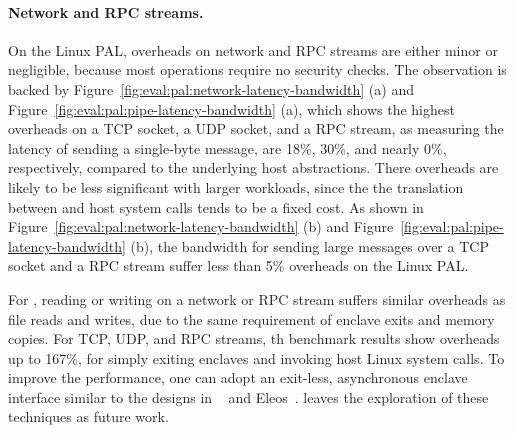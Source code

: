 






\paragraph{Network and RPC streams.}
On the Linux PAL, overheads on network and RPC streams are either minor or negligible,
because most operations require
no security checks.
The observation is backed by Figure~\ref{fig:eval:pal:network-latency-bandwidth} (a)
and
Figure~\ref{fig:eval:pal:pipe-latency-bandwidth} (a),
which shows the highest overheads on a TCP socket, a UDP socket, and a RPC stream,
as measuring the latency of sending a single-byte message,
are \roughly{}18\%, \roughly{}30\%,
and nearly 0\%, respectively, compared to the underlying host abstractions.
There overheads are likely to be less significant
with larger workloads,
since the the translation
between \thehostabi{} and host system calls
tends to be a fixed cost.
As shown in Figure~\ref{fig:eval:pal:network-latency-bandwidth} (b) and Figure~\ref{fig:eval:pal:pipe-latency-bandwidth} (b),
the bandwidth for sending large messages
over a TCP socket and a RPC stream suffer less than 5\% overheads on the Linux PAL.


For \sgx{}, reading or writing on a network or RPC stream
suffers similar overheads as file reads and writes,
due to the same requirement of enclave exits and memory copies.
For TCP, UDP, and RPC streams,
th benchmark results show overheads up to 167\%,
for simply exiting enclaves
and invoking host Linux system calls.
To improve the performance, one can adopt an exit-less, asynchronous enclave interface
similar to the designs in \scone{}~\cite{osdi16scone} and Eleos~\cite{orenbach17eleos}.
\graphene{} leaves the exploration of these techniques as future work.




